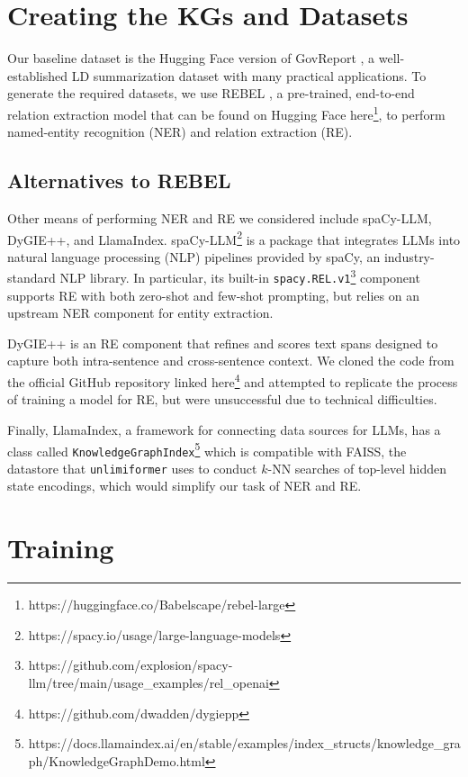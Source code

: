 \documentclass[12pt]{article}
\begin{document}
\section{Creating the KGs and Datasets}
Our baseline dataset is the Hugging Face version of GovReport
\cite{huang2021efficient}, a well-established LD summarization dataset with
many practical applications. To generate the required datasets, we use REBEL
\cite{huguet2021rebel}, a pre-trained, end-to-end relation extraction model
that can be found on Hugging Face
here\footnote{https://huggingface.co/Babelscape/rebel-large}, to perform
named-entity recognition (NER) and relation extraction (RE).




\subsection*{Alternatives to REBEL}

Other means of performing NER and RE we considered include spaCy-LLM, DyGIE++,
and LlamaIndex. spaCy-LLM\footnote{https://spacy.io/usage/large-language-models}
is a package that integrates LLMs into natural language processing (NLP) pipelines
provided by spaCy, an industry-standard NLP library.
In particular, its built-in
\texttt{spacy.REL.v1}\footnote{https://github.com/explosion/spacy-llm/tree/main/usage\_examples/rel\_openai}
component supports RE with both zero-shot and few-shot prompting, but relies on an upstream NER component for entity extraction. 

DyGIE++ is an RE component that refines and scores text spans designed to
capture both intra-sentence and cross-sentence context. We cloned the code from
the official GitHub repository linked
here\footnote{https://github.com/dwadden/dygiepp} and attempted to replicate
the process of training a model for RE, but were unsuccessful due to technical
difficulties. 

Finally, LlamaIndex, a framework for connecting data sources for LLMs, has a class called \texttt{KnowledgeGraphIndex}\footnote{https://docs.llamaindex.ai/en/stable/examples/index\_structs/knowledge\_graph/KnowledgeGraphDemo.html} which is compatible with FAISS, the datastore that \texttt{unlimiformer} uses to conduct $k$-NN searches of top-level hidden state encodings, which would simplify our task of NER and RE.

\section{Training}
\end{document}
